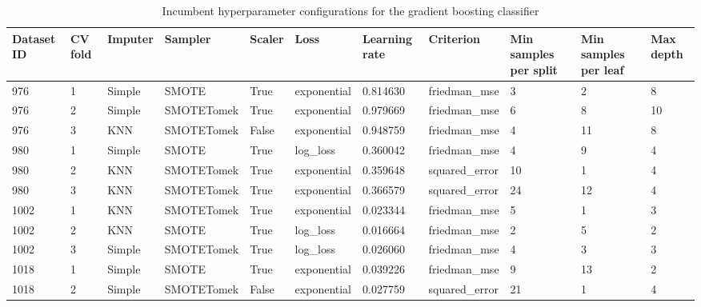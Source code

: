 \documentclass[11pt]{article}
\begin{document}
\begin{table}
\footnotesize
\caption{Incumbent hyperparameter configurations for the gradient boosting classifier}
\center
\begin{tabular}{lllllllllll}
\toprule
Dataset ID & CV fold & Imputer &    Sampler & Scaler &        Loss &  Learning rate &     Criterion & Min samples per split & Min samples per leaf & Max depth \\
\midrule
       976 &       1 &  Simple &      SMOTE &   True & exponential &       0.814630 &  friedman\_mse &                     3 &                    2 &         8 \\
       976 &       2 &  Simple & SMOTETomek &   True & exponential &       0.979669 &  friedman\_mse &                     6 &                    8 &        10 \\
       976 &       3 &     KNN & SMOTETomek &  False & exponential &       0.948759 &  friedman\_mse &                     4 &                   11 &         8 \\
\midrule
       980 &       1 &  Simple &      SMOTE &   True &    log\_loss &       0.360042 &  friedman\_mse &                     4 &                    9 &         4 \\
       980 &       2 &     KNN & SMOTETomek &   True & exponential &       0.359648 & squared\_error &                    10 &                    1 &         4 \\
       980 &       3 &     KNN & SMOTETomek &   True & exponential &       0.366579 & squared\_error &                    24 &                   12 &         4 \\
\midrule
      1002 &       1 &     KNN & SMOTETomek &   True & exponential &       0.023344 &  friedman\_mse &                     5 &                    1 &         3 \\
      1002 &       2 &     KNN &      SMOTE &   True &    log\_loss &       0.016664 &  friedman\_mse &                     2 &                    5 &         2 \\
      1002 &       3 &  Simple & SMOTETomek &   True &    log\_loss &       0.026060 &  friedman\_mse &                     4 &                    3 &         3 \\
\midrule
      1018 &       1 &  Simple &      SMOTE &   True & exponential &       0.039226 &  friedman\_mse &                     9 &                   13 &         2 \\
      1018 &       2 &  Simple & SMOTETomek &  False & exponential &       0.027759 & squared\_error &                    21 &                    1 &         4 \\

\end{tabular}
\end{table}
\end{document}
